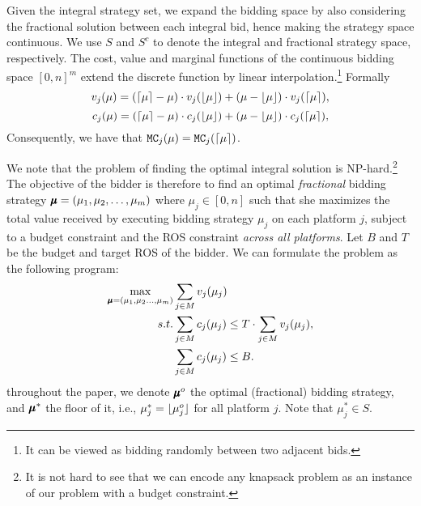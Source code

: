{Given the integral strategy set, we expand the bidding space by also considering the fractional solution between each integral bid, hence making the strategy space continuous. We use $S$ and $S^c$ to denote the integral and fractional strategy space, respectively. The cost, value and marginal functions of the continuous bidding space $[0,n]^m$ extend the discrete function by linear interpolation.\footnote{It can be viewed as bidding randomly between two adjacent bids.} Formally
\[v_j(\mu) = (\lceil\mu\rceil - \mu) \cdot v_j(\lfloor\mu\rfloor) + (\mu -\lfloor\mu\rfloor)  \cdot v_j(\lceil\mu\rceil),\]
\[c_j(\mu) = (\lceil\mu\rceil - \mu) \cdot c_j(\lfloor\mu\rfloor) +(\mu -\lfloor\mu\rfloor)  \cdot c_j(\lceil\mu\rceil),\]
Consequently, we have that $\texttt{MC}_j(\mu) = \texttt{MC}_j(\lceil\mu\rceil)$.}

{We note that the problem of finding the optimal integral solution is NP-hard.\footnote{It is not hard to see that we can encode any knapsack problem as an instance of our problem with a budget constraint.}}
The objective of the bidder is therefore to find an optimal \emph{fractional}  bidding strategy $\pmb{\mu} = (\mu_1, \mu_2, \dots, \mu_m)$ {where $\mu_j \in [0,n]$} such that she maximizes the total value received by executing bidding strategy $\mu_j$ on each platform $j$, subject to {a budget constraint} and the ROS constraint \emph{across all platforms}.
Let {$B$ and} $T$ be the budget and target ROS of the bidder. We can formulate the problem as the following program:
{\begin{align}\label{eq:bidderproblem}
    \max_{\pmb{\mu}=(\mu_1, \mu_2 \dots, \mu_m)} &\sum_{j \in M} v_j(\mu_j) \nonumber\\
    s.t. & \sum_{j \in M} c_j(\mu_j) \leq T \cdot \sum_{j \in M} v_j(\mu_j),\\
    & \sum_{j \in M} c_j(\mu_j) \leq B. \nonumber 
\end{align}}
{throughout the paper, we denote $\mathbf{\pmb{\mu}}^o$ the optimal (fractional) bidding strategy, and $\mathbf{\pmb{\mu}}^*$ the floor of it, i.e., $\mu_j^* = \lfloor\mu^o_j\rfloor$ for all platform $j$. Note that $\mu_j^* \in S$.}

